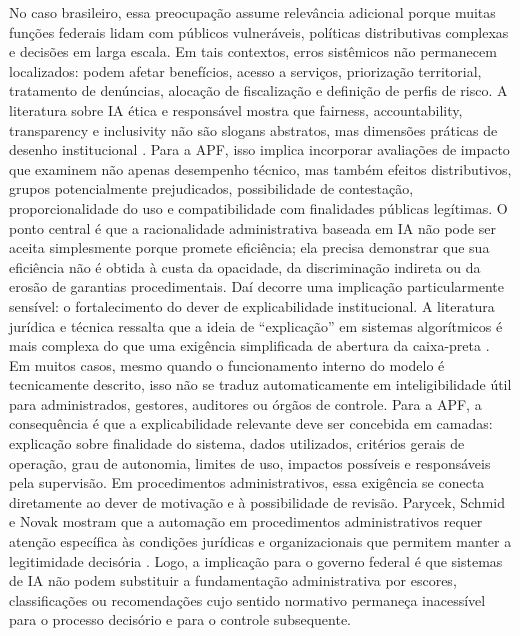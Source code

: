 \documentclass[12pt,a4paper]{article}
\begin{document}
No caso brasileiro, essa preocupação assume relevância adicional porque muitas funções federais lidam com públicos vulneráveis, políticas distributivas complexas e decisões em larga escala. Em tais contextos, erros sistêmicos não permanecem localizados: podem afetar benefícios, acesso a serviços, priorização territorial, tratamento de denúncias, alocação de fiscalização e definição de perfis de risco. A literatura sobre IA ética e responsável mostra que fairness, accountability, transparency e inclusivity não são slogans abstratos, mas dimensões práticas de desenho institucional \autocite{batool2025ai} \autocite{sigfrids2022how}. Para a APF, isso implica incorporar avaliações de impacto que examinem não apenas desempenho técnico, mas também efeitos distributivos, grupos potencialmente prejudicados, possibilidade de contestação, proporcionalidade do uso e compatibilidade com finalidades públicas legítimas. O ponto central é que a racionalidade administrativa baseada em IA não pode ser aceita simplesmente porque promete eficiência; ela precisa demonstrar que sua eficiência não é obtida à custa da opacidade, da discriminação indireta ou da erosão de garantias procedimentais.
Daí decorre uma implicação particularmente sensível: o fortalecimento do dever de explicabilidade institucional. A literatura jurídica e técnica ressalta que a ideia de “explicação” em sistemas algorítmicos é mais complexa do que uma exigência simplificada de abertura da caixa-preta \autocite{brkan2020legal}. Em muitos casos, mesmo quando o funcionamento interno do modelo é tecnicamente descrito, isso não se traduz automaticamente em inteligibilidade útil para administrados, gestores, auditores ou órgãos de controle. Para a APF, a consequência é que a explicabilidade relevante deve ser concebida em camadas: explicação sobre finalidade do sistema, dados utilizados, critérios gerais de operação, grau de autonomia, limites de uso, impactos possíveis e responsáveis pela supervisão. Em procedimentos administrativos, essa exigência se conecta diretamente ao dever de motivação e à possibilidade de revisão. Parycek, Schmid e Novak mostram que a automação em procedimentos administrativos requer atenção específica às condições jurídicas e organizacionais que permitem manter a legitimidade decisória \autocite{parycek2023artificial}. Logo, a implicação para o governo federal é que sistemas de IA não podem substituir a fundamentação administrativa por escores, classificações ou recomendações cujo sentido normativo permaneça inacessível para o processo decisório e para o controle subsequente.
\end{document}
